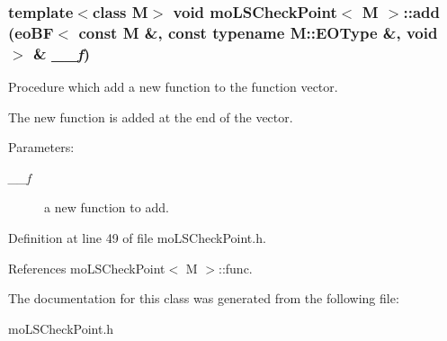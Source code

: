 \subsubsection{\setlength{\rightskip}{0pt plus 5cm}template$<$class M$>$ void {\bf mo\-LSCheck\-Point}$<$ M $>$::add ({\bf eo\-BF}$<$ const M \&, const typename M::EOType \&, void $>$ \& {\em \_\-\_\-f})\hspace{0.3cm}{\tt  [inline]}}\label{classmo_l_s_check_point_66be5fe2944bcdd752f1e58105e969a6}


Procedure which add a new function to the function vector. 

The new function is added at the end of the vector. \begin{Desc}
\item[Parameters:]
\begin{description}
\item[{\em \_\-\_\-f}]a new function to add. \end{description}
\end{Desc}


Definition at line 49 of file mo\-LSCheck\-Point.h.

References mo\-LSCheck\-Point$<$ M $>$::func.

The documentation for this class was generated from the following file:\begin{CompactItemize}
\item 
mo\-LSCheck\-Point.h\end{CompactItemize}
